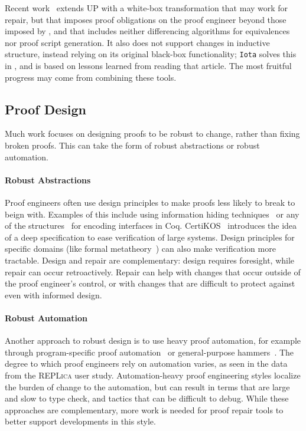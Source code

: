 Recent work~\cite{tabareau2019marriage} extends UP with 
a white-box transformation that may work for repair,
but that imposes proof obligations on the proof engineer beyond those imposed by \toolnamec,
and that includes neither differencing algorithms for equivalences nor proof script generation.
It also does not support changes in inductive structure,
instead relying on its original black-box functionality;
\lstinline{Iota} solves this in \toolnamec, and is based on lessons learned from reading that article.
The most fruitful progress may come from combining these tools. %

\subsection{Proof Design}
\label{sec:design}

Much work focuses on designing proofs
to be robust to change, rather than fixing broken proofs.
This can take the form of robust abstractions or robust automation.


\paragraph{Robust Abstractions}
Proof engineers often use design principles to make proofs less likely to break to beign with.
Examples of this include using 
information hiding techniques~\cite{Woos:2016:PCF:2854065.2854081, Klein2014}
or any of the structures~\cite{Chrzaszcz2003, Sozeau2008, Saibi:PhD} for encoding interfaces in Coq.
CertiKOS~\cite{certikos} introduces the idea of a deep specification to ease verification of large systems.
Design principles for specific domains (like formal metatheory~\cite{Aydemir2008, Delaware2013POPL, Delaware2013ICFP})
can also make verification more tractable.
Design and repair are complementary: design requires foresight, while repair can occur retroactively.
Repair can help with changes that occur outside of the proof engineer's control,
or with changes that are difficult to protect against even with informed design.

\paragraph{Robust Automation}
Another approach to robust design is to use heavy proof automation, for example through
program-specific proof automation~\cite{chlipala:cpdt}
or general-purpose hammers~\cite{Blanchette2016b, Blanchette2013, Kaliszyk2014, Czajka2018}.
The degree to which proof engineers rely on automation varies, as seen in the data from the \textsc{REPLica} user study.
Automation-heavy proof engineering styles localize the burden of change to the automation,
but can result in terms that are large and slow to type check,
and tactics that can be difficult to debug.
While these approaches are complementary, more work is needed for proof repair tools to better support 
developments in this style.

